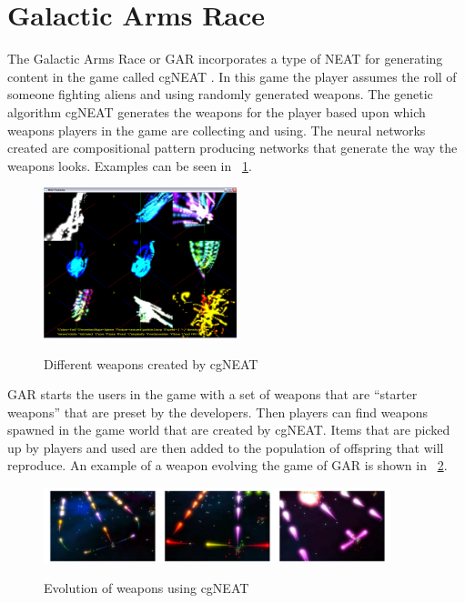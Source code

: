 \documentclass[12pt]{ucthesis} \newif\ifpdf \ifx\pdfoutput\undefined
\begin{document}
\section{Galactic Arms Race}

The Galactic Arms Race or GAR incorporates a type of NEAT for generating content
in the game called cgNEAT \cite{hastings2009evolving}. In this game the player
assumes the roll of someone fighting aliens and using randomly generated
weapons.
The genetic algorithm cgNEAT generates the weapons for the player based
upon which weapons players in the game are collecting and using. The
neural networks created are compositional pattern producing networks that
generate the way the weapons looks\cite{hastings2009evolving}. Examples can be
seen in ~\ref{fig:weapons}.

\begin{figure}[h!] 
\caption{Different weapons created by cgNEAT}
  \centering
    \includegraphics[width=0.5\textwidth]{weapons.jpg}
   \label{fig:weapons} 
\end{figure}

GAR starts the users in the game with a set of weapons that are “starter
weapons” that are preset by the developers. Then players can find weapons
spawned in the game world that are created by cgNEAT. Items that are picked up by
players and used are then added to the population of offspring that will
reproduce. An example of a weapon evolving the game of GAR is shown
in ~\ref{fig:evoguns}.

\begin{figure}[h!] 
\caption{Evolution of weapons using cgNEAT}
  \centering
    \includegraphics[width=0.9\textwidth]{evoguns.png}
   \label{fig:evoguns} 
\end{figure}
\end{document}
